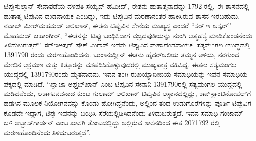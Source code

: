 ಟಿಪ್ಪುಸುಲ್ತಾನ್​ ಸೇನಾಪಡೆಯ ದಳಪತಿ ಸಯ್ಯದ್​ ಹಮೀದ್​,\enginline{-} ಈತನು ಹುತಾತ್ಮನಾದದ್ದು 1792 ರಲ್ಲಿ, ಈ ಶಾಸನದಲ್ಲಿ ಹುತಾತ್ಮ ಟಿಪುವಿನ ದಂಡನಾಯಕ ಎಂದಿದ್ದು, ಇದು ಟಿಪ್ಪುವಿನ ಮರಣಾನಂತರ ಹಾಕಿಸಿರುವ ಶಾಸನ ಇರಬಹುದು. ನವಾಬ್​ ಮೀರ್​ಮಹಮದ್​ ಅಲಿಖಾನ್​,\enginline{-} ಈತನು ಟಿಪ್ಪುವಿನ ಸೇನೆಯ ಮುಖ್ಯಸ್ಥ ಎಂದರೆ “ಸರ್​ ಇ ಅಸ್ಕರ್​” ಮೊಹಮದ್​ ಜಹಾಂಗೀರ್​, “ಈತನನ್ನು ಟಿಪ್ಪು ಬಂಧಿಸಿದಾಗ ವಜ್ರದಪುಡಿಯನ್ನು ನುಂಗಿ ಆತ್ಮಹತ್ಯೆ ಮಾಡಿಕೊಂಡನೆಂದು ತಿಳಿದು\-ಬರುತ್ತದೆ”. ಸರ್​\enginline{-}ಇ\enginline{-}ಅಸ್ಕರ್​ ಷೇಕ್​ ಮಿರಾನ್​\enginline{-} ಇವನು ಟಿಪ್ಪುವಿನ ಮಹಾದಂಡನಾಯಕ. ಸತ್ಯಮಂಗಲ ಯುದ್ಧದಲ್ಲಿ 13\enginline{-}9\enginline{-}1790 ರಂದು ಮರಣಹೊಂದಿದನು. ಬುರಾನುದ್ದೀನ್​\enginline{-} ಈತನು ಹೈದರ್​ಅಲಿಯ ತಮ್ಮನ ಅಳಿಯ, ನರಗುಂದ ಮೇಲಿನ ಆಕ್ರಮಣ ಮತ್ತು ಕಿತ್ತೂರನ್ನು ವಶಪಡಿಸಿಕೊಳ್ಳುವುದರಲ್ಲಿ ಮುಖ್ಯಪಾತ್ರ ವಹಿಸಿದ್ದ. ಈತನು ಸತ್ಯಮಂಗಲ ಯುದ್ಧದಲ್ಲಿ 13\enginline{-}9\enginline{-}1790ರಂದು ಮೃತನಾದನು. ಇವನ ತಂಗಿ ರುಖಯ್ಯಾಬೀಬಿಯ ಸಮಾಧಿಯನ್ನು ಇವನ ಸಮಾಧಿಯ ಪಕ್ಕದಲ್ಲಿ ಮಾಡಿದೆ. “ಖ್ವಾಜಾ ಅಫ್ತಬ್​ಖಾನ್​ ಎಂಬ ಟಿಪ್ಪವಿನ ಸೇನಾನಿ 13\enginline{-}9\enginline{-}1790ರಲ್ಲಿ ಸತ್ಯಮಂಗಲ ಯುದ್ಧದಲ್ಲಿ ಮಡಿದನೆಂದು, ಆರ್ಕಾಟಿನವನಾದ ಕುಂಟ ಗುಲಾಮ್ ಅಲಿಖಾನ್​ ಟಿಪ್ಪುವಿನ ಆಸ್ಥಾನದಲ್ಲಿದ್ದು, ಕಾನ್​ಸ್ಟಾಂಟಿನೋಪಲ್​ಗೆ ಹಡಗಿನ ಮೂಲಕ ನಿಯೋಗನವನ್ನು ಕೊಂಡು ಹೋಗಿದ್ದನೆಂದು, ಅಲ್ಲಿಂದ ತಂದ ಉಡುಗೊರೆಗಳನ್ನು ಪೂರ್ತಿ ಟಿಪ್ಪುವಿಗ ಕೊಡದೇ ಇದ್ದಾಗ, ಟಿಪ್ಪು ಇವನನ್ನು ಬಂಧಿಸಿ ಸೆರೆಯಲ್ಲಿಡಿಸಿದನೆಂದು ತಿಳಿದುಬರುತ್ತದೆ. ಇವನ ಸಮಾಧಿ ಗಂಜಾಮ್ ಬಳಿ ಅಬ್ಬಾಸ್​ಗಾರ್ಡನ್​ ಎಂಬ ಖಾಸಗಿ ತೋಟದಲ್ಲಿದ್ದು ಅಲ್ಲಿರುವ ಶಾಸನದಿಂದ ಈತ 20\enginline{-}7\enginline{-}1792 ರಲ್ಲಿ ಮರಣಹೊಂದಿನೆಂದು ತಿಳಿದುಬರುತ್ತದೆ”.


